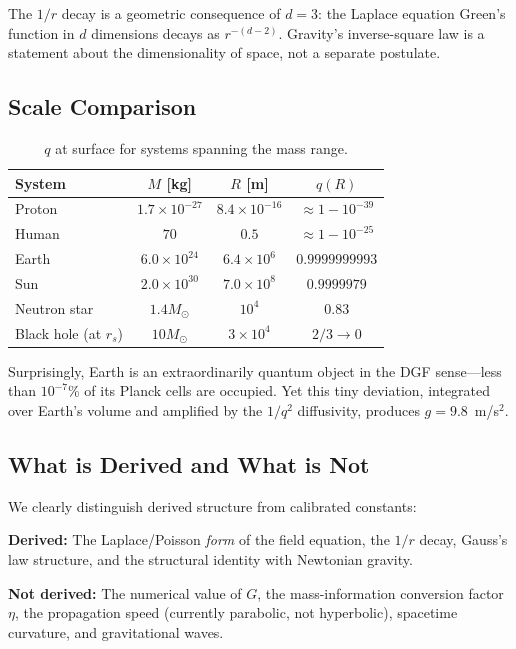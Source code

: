 \documentclass[reprint]{revtex4-2}
\begin{document}
The $1/r$ decay is a geometric consequence of $d=3$: the Laplace equation Green's function in $d$ dimensions decays as $r^{-(d-2)}$. Gravity's inverse-square law is a statement about the dimensionality of space, not a separate postulate.

\subsection{Scale Comparison}

\begin{table}[h]
\caption{$q$ at surface for systems spanning the mass range.}
\begin{tabular}{lccc}
\toprule
System & $M$ [kg] & $R$ [m] & $q(R)$ \\
\midrule
Proton & $1.7\times 10^{-27}$ & $8.4\times 10^{-16}$ & $\approx 1-10^{-39}$ \\
Human & $70$ & $0.5$ & $\approx 1-10^{-25}$ \\
Earth & $6.0\times 10^{24}$ & $6.4\times 10^6$ & $0.9999999993$ \\
Sun & $2.0\times 10^{30}$ & $7.0\times 10^8$ & $0.9999979$ \\
Neutron star & $1.4M_\odot$ & $10^4$ & $0.83$ \\
Black hole (at $r_s$) & $10M_\odot$ & $3\times 10^4$ & $2/3\to 0$ \\
\bottomrule
\end{tabular}
\end{table}

Surprisingly, Earth is an extraordinarily quantum object in the DGF sense---less than $10^{-7}$\% of its Planck cells are occupied. Yet this tiny deviation, integrated over Earth's volume and amplified by the $1/q^2$ diffusivity, produces $g=9.8$~m/s$^2$.

\subsection{What is Derived and What is Not}

We clearly distinguish derived structure from calibrated constants:

\textbf{Derived:} The Laplace/Poisson \emph{form} of the field equation, the $1/r$ decay, Gauss's law structure, and the structural identity with Newtonian gravity.

\textbf{Not derived:} The numerical value of $G$, the mass-information conversion factor $\eta$, the propagation speed (currently parabolic, not hyperbolic), spacetime curvature, and gravitational waves.
\end{document}
